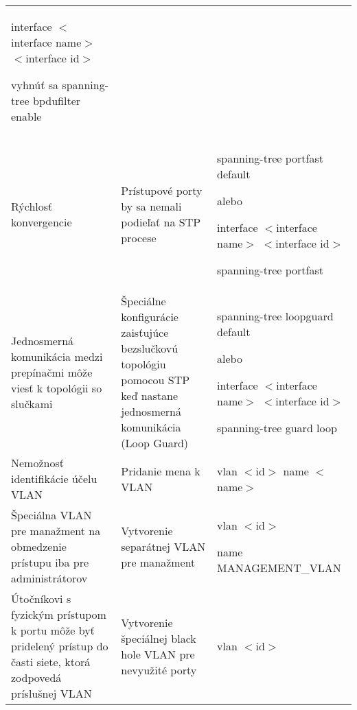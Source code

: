 \begin{longtable}[!htbp]{|L{10em}L{10em}>{\selectfont}L{34em}|}
	
	interface $<$interface name$>$ $<$interface id$>$
	
	{\selectfont \hspace{0.5em}vyhnúť sa} spanning-tree bpdufilter enable\\
	
	
	
	
	Rýchlosť konvergencie	&Prístupové porty by sa nemali podieľať na STP procese	&spanning-tree portfast default
	
	\vspace{0.5em}
	{\selectfont alebo}
	\vspace{0.5em}
	
	interface $<$interface name$>$ $<$interface id$>$
	
	\hspace{0.5em}spanning-tree portfast\\
	
	
	
	
	 Jednosmerná komunikácia medzi prepínačmi môže viesť k topológii so slučkami	& Špeciálne konfigurácie zaisťujúce bezslučkovú topológiu pomocou STP keď nastane jednosmerná komunikácia (Loop Guard)	&spanning-tree loopguard default
	
	\vspace{0.5em}
	{\selectfont alebo }
	\vspace{0.5em}
	
	interface $<$interface name$>$ $<$interface id$>$
	
	\hspace{0.5em}spanning-tree guard loop\\
	
	
	
	
	Nemožnosť identifikácie účelu VLAN	&Pridanie mena k VLAN	&vlan $<$id$>$
	name $<$name$>$\\
	
	
	
	
	 Špeciálna VLAN pre manažment na obmedzenie prístupu iba pre administrátorov	&Vytvorenie separátnej VLAN pre manažment	&vlan $<$id$>$
	
	\hspace{0.5em}name MANAGEMENT\_VLAN\\
	
	
	
	
	Útočníkovi s fyzickým prístupom k portu môže byť pridelený prístup do časti siete, ktorá zodpovedá príslušnej VLAN 	&Vytvorenie špeciálnej black hole VLAN pre nevyužité porty	&vlan $<$id$>$ 
	

\end{longtable}
